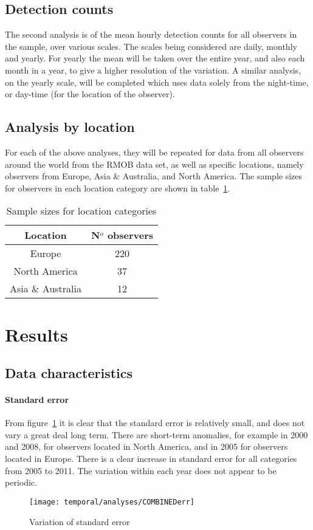 \subsection{Detection counts}
The second analysis is of the mean hourly detection counts for all observers in the sample, over various scales. The scales being considered are daily, monthly and yearly. For yearly the mean will be taken over the entire year, and also each month in a year, to give a higher resolution of the variation. A similar analysis, on the yearly scale, will be completed which uses data solely from the night-time, or day-time (for the location of the observer).
\subsection{Analysis by location}
For each of the above analyses, they will be repeated for data from all observers around the world from the RMOB data set, as well as specific locations, namely observers from Europe, Asia \& Australia, and North America. The sample sizes for observers in each location category are shown in table~\ref{tab:temp:sizes}.
\begin{table}
	\centering
	\begin{tabular}{cc}
		\hline
		Location & N$^o$ observers \\
		\hline 
		Europe & 220 \\
		North America & 37 \\
		Asia \& Australia & 12 \\
		\hline
	\end{tabular}
	\caption{Sample sizes for location categories 
		\label{tab:temp:sizes}}
\end{table}
\section{Results}
\subsection{Data characteristics}
\paragraph{Standard error\\
	\label{par:err}}
From figure~\ref{fig:temp:err} it is clear that the standard error is relatively small, and does not vary a great deal long term. There are short-term anomalies, for example in 2000 and 2008, for observers located in North America, and in 2005 for observers located in Europe. There is a clear increase in standard error for all categories from 2005 to 2011. The variation within each year does not appear to be periodic.
\begin{figure}[h!]
	\centering
	\texttt{[image: temporal/analyses/COMBINEDerr]}
	\caption{Variation of standard error
		\label{fig:temp:err}}
\end{figure}
